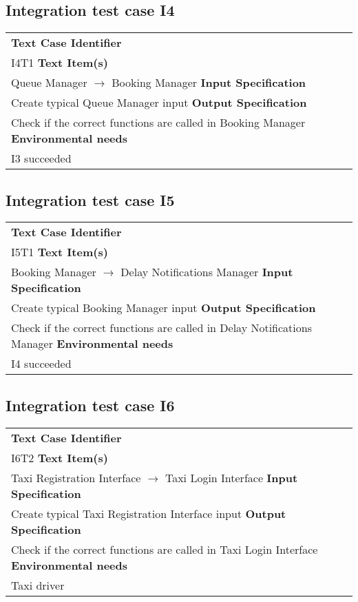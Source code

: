\subsection{Integration test case I4}
	\begin{tabular} {l p{9cm}}
		\hline \textbf{Text Case Identifier} & \\ I4T1
		\hline \textbf{Text Item(s)} & \\ Queue Manager $\rightarrow$ Booking Manager
		\hline \textbf{Input Specification} & \\ Create typical Queue Manager input
		\hline \textbf{Output Specification} & \\ Check if the correct functions are called in Booking Manager
		\hline \textbf{Environmental needs} & \\ I3 succeeded
		\hline 
	\end{tabular}
\subsection{Integration test case I5}
	\begin{tabular} {l p{9cm}}
		\hline \textbf{Text Case Identifier} & \\ I5T1
		\hline \textbf{Text Item(s)} & \\ Booking Manager $\rightarrow$ Delay Notifications Manager
		\hline \textbf{Input Specification} & \\ Create typical Booking Manager input
		\hline \textbf{Output Specification} & \\ Check if the correct functions are called in Delay Notifications Manager
		\hline \textbf{Environmental needs} & \\ I4 succeeded
		\hline 
	\end{tabular}
\subsection{Integration test case I6}
	\begin{tabular} {l p{9cm}}
		\hline \textbf{Text Case Identifier} & \\ I6T2
		\hline \textbf{Text Item(s)} & \\ Taxi Registration Interface $\rightarrow$ Taxi Login Interface
		\hline \textbf{Input Specification} & \\ Create typical Taxi Registration Interface input
		\hline \textbf{Output Specification} & \\ Check if the correct functions are called in Taxi Login Interface
		\hline \textbf{Environmental needs} & \\ Taxi driver
		\hline 
	\end{tabular}